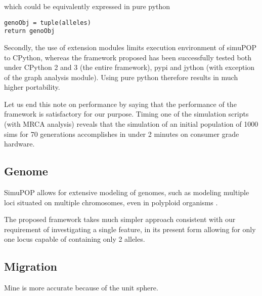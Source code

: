 \documentclass{l4proj}
\newif\ifdebug
\begin{document}
which could be equivalently expressed in pure python 

\begin{lstlisting}
genoObj = tuple(alleles)
return genoObj    
\end{lstlisting}

\ifdebug

Simon suggests to remove this paragraph.

Secondly, a study correlating error rates with programming languages has shown C++ programmers make more errors than python programmers: [cite error rates: macbeth.cs.ucdavis.edu/lang\_study.pdf]. These results must be treated with a pinch of salt -- correlation does not imply causation and arguably more depends on the quality of the programmer than on the quality of programming language, additionally the methodology of parsing commit messages to detect bug fixes employed by this study is rather experimental.
\fi
Secondly, the use of extension modules limits execution environment of simuPOP to CPython, whereas the framework proposed has been successfully tested both under CPython 2 and 3 (the entire framework), pypi and jython (with exception of the graph analysis module). Using pure python therefore results in much higher portability.

Let us end this note on performance by saying that the performance of the framework is satisfactory for our purpose. Timing one of the simulation scripts (with MRCA analysis) reveals that the simulation of an initial population of 1000 sims for 70 generations accomplishes in under 2 minutes on consumer grade hardware.

\subsection{Genome}
SimuPOP allows for extensive modeling of genomes, such as modeling multiple loci situated on multiple \gls{chromosome}s, even in \gls{polyploid} organisms \parencite{simuPOP16}.

The proposed framework takes much simpler approach consistent with our requirement of investigating a single feature, in its present form allowing for only one \gls{locus} capable of containing only 2 alleles.

\subsection{Migration}
Mine is more accurate because of the unit sphere.
\end{document}
